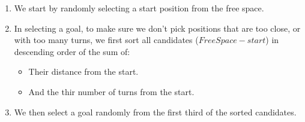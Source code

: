 \documentclass{article}
\begin{document}
\begin{enumerate}
  \item We start by randomly selecting a start position from the free space.
  \item In selecting a goal, to make sure we don't pick positions that are too close, 
    or with too many turns, 
    we first sort all candidates ($FreeSpace - start$) in descending order of the sum of:
    \begin{itemize}
      \item Their distance from the start.
      \item And the thir number of turns from the start.
    \end{itemize}
  \item We then select a goal randomly from the first third of the sorted candidates.
\end{enumerate}
\end{document}
